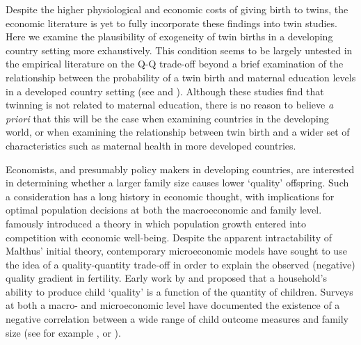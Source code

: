 \documentclass{article}[11pt,subeqn]
\begin{document}
\begin{spacing}{1.5}
Despite the higher physiological and economic costs of giving birth to twins, the economic literature is yet to fully incorporate these findings into twin 
studies.  Here we examine the plausibility of exogeneity of twin births in a developing country setting more exhaustively.  This condition seems to be largely 
untested in the empirical literature on the Q-Q trade-off beyond a brief examination of the relationship between the probability of a twin birth and 
maternal education levels in a developed country setting (see \citet{Blacketal2005} and \citet{Angristetal2010}).  Although these studies find that twinning 
is not related to maternal education, there is no reason to believe \emph{a priori} that this will be the case when examining countries in the developing world, 
or when examining the relationship between twin birth and a wider set of characteristics such as maternal health in more developed countries. 

Economists, and presumably policy makers in developing countries, are interested in determining whether a larger family size causes lower `quality' offspring.  
Such a consideration has a long history in economic thought, with implications for optimal population decisions at both the macroeconomic and family level.  
\citet{Malthus1798} famously introduced a theory in which population growth entered into competition with economic well-being.  Despite the apparent 
intractability of Malthus' initial theory, contemporary microeconomic models have sought to use the idea of a quality-quantity trade-off in order to explain the 
observed (negative) quality gradient in fertility.  Early work by \citet{BeckerLewis1973} and \citet{BeckerTomes1976} proposed that a household's ability to 
produce child `quality' is a function of the quantity of children.  Surveys at both a macro- and microeconomic level have documented the existence of a 
negative correlation between a wide range of child outcome measures and family size (see for example \cite{Desai1995}, or \cite{Hanushek1992}).


\end{spacing}
\end{document}

